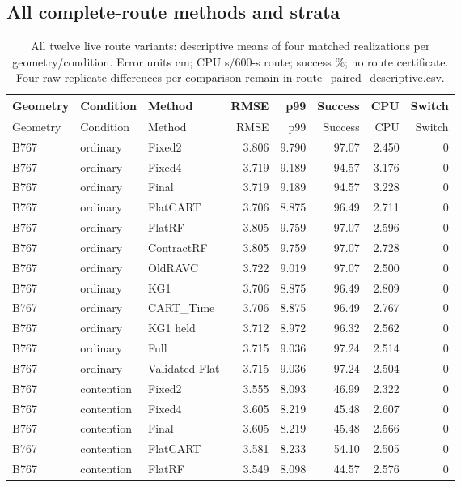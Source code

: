 \subsection{All complete-route methods and strata}
\small\begin{longtable}{@{}lllrrrrr@{}}
\caption{All twelve live route variants: descriptive means of four matched realizations per geometry/condition. Error units cm; CPU s/600-s route; success \%; no route certificate. Four raw replicate differences per comparison remain in route\_paired\_descriptive.csv.}\label{supp:all-routes}\\\toprule
Geometry & Condition & Method & RMSE & p99 & Success & CPU & Switch\\\midrule\endfirsthead
\toprule
Geometry & Condition & Method & RMSE & p99 & Success & CPU & Switch\\\midrule\endhead
B767 & ordinary & Fixed2 & 3.806 & 9.790 & 97.07 & 2.450 & 0\\
B767 & ordinary & Fixed4 & 3.719 & 9.189 & 94.57 & 3.176 & 0\\
B767 & ordinary & Final & 3.719 & 9.189 & 94.57 & 3.228 & 0\\
B767 & ordinary & FlatCART & 3.706 & 8.875 & 96.49 & 2.711 & 0\\
B767 & ordinary & FlatRF & 3.805 & 9.759 & 97.07 & 2.596 & 0\\
B767 & ordinary & ContractRF & 3.805 & 9.759 & 97.07 & 2.728 & 0\\
B767 & ordinary & OldRAVC & 3.722 & 9.019 & 97.07 & 2.500 & 0\\
B767 & ordinary & KG1 & 3.706 & 8.875 & 96.49 & 2.809 & 0\\
B767 & ordinary & CART\_Time & 3.706 & 8.875 & 96.49 & 2.767 & 0\\
B767 & ordinary & KG1 held & 3.712 & 8.972 & 96.32 & 2.562 & 0\\
B767 & ordinary & Full & 3.715 & 9.036 & 97.24 & 2.514 & 0\\
B767 & ordinary & Validated Flat & 3.715 & 9.036 & 97.24 & 2.504 & 0\\
B767 & contention & Fixed2 & 3.555 & 8.093 & 46.99 & 2.322 & 0\\
B767 & contention & Fixed4 & 3.605 & 8.219 & 45.48 & 2.607 & 0\\
B767 & contention & Final & 3.605 & 8.219 & 45.48 & 2.566 & 0\\
B767 & contention & FlatCART & 3.581 & 8.233 & 54.10 & 2.505 & 0\\
B767 & contention & FlatRF & 3.549 & 8.098 & 44.57 & 2.576 & 0\\

\end{longtable}
